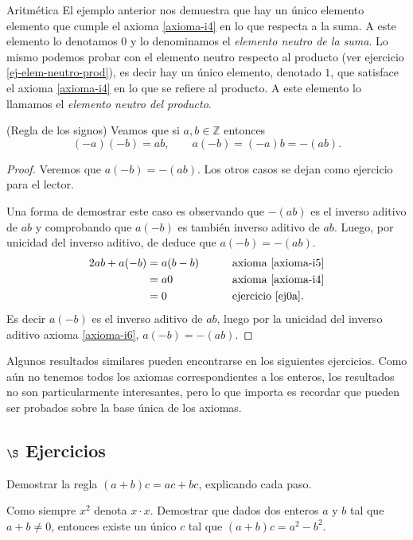 \begin{section}{Aritmética}
El ejemplo anterior nos demuestra que hay un único elemento elemento que cumple el axioma \ref{axioma-i4} en lo que respecta a la suma. A este elemento lo denotamos $0$ y lo denominamos el {\em elemento neutro de la suma}. Lo mismo podemos probar con el elemento neutro respecto al producto (ver ejercicio \ref{ej-elem-neutro-prod}),  es decir hay un único elemento,  denotado $1$, que satisface el axioma \ref{axioma-i4} en lo que se refiere al producto. A  este elemento lo llamamos el {\em elemento neutro del producto}.  

\begin{ejemplo*} (Regla de los signos) Veamos que  si $a,b \in \mathbb Z$ entonces
$$
(-a)(-b) = ab ,\qquad a(-b) = (-a)b = -(ab).
$$
\end{ejemplo*}
\begin{proof}
Veremos que  $a(-b) = -(ab)$. Los otros casos se dejan como ejercicio para el lector.

Una forma de demostrar este caso es  observando que $-(ab)$ es el inverso aditivo de $ab$ y comprobando que $a(-b)$ es también inverso aditivo de $ab$. Luego, por unicidad del inverso aditivo, de deduce que $a(-b) = -(ab)$. 
\begin{alignat*}2
ab + a(-b) &=a(b-b) &\qquad &\text{axioma \ref{axioma-i5}} \\
&=a0 &\qquad &\text{axioma \ref{axioma-i4}}\\
&= 0 &\qquad &\text{ejercicio \ref{ej0a}}.
\end{alignat*}
Es decir $a(-b)$ es el inverso aditivo de $ab$, luego por la unicidad del inverso aditivo axioma \ref{axioma-i6}, $a(-b)=-(ab)$.
\end{proof}


Algunos resultados similares pueden encontrarse en los siguientes ejercicios. Como aún no tenemos todos los axiomas correspondientes a los enteros, los resultados no son particularmente interesantes, pero lo que importa es recordar que pueden ser probados sobre la base única de los axiomas.


\subsection*{$\S$ Ejercicios}

\begin{enumex}
\item Demostrar la regla $(a+b)c=ac+bc$, explicando cada paso.

\item Como siempre $x^2$ denota $x\cdot x$. Demostrar que dados dos enteros $a$ y $b$ tal que $a+b \not=0$, entonces existe un único $c$ tal que $(a+b)c=
a^2 - b^2$.


\end{enumex}
\end{section}
